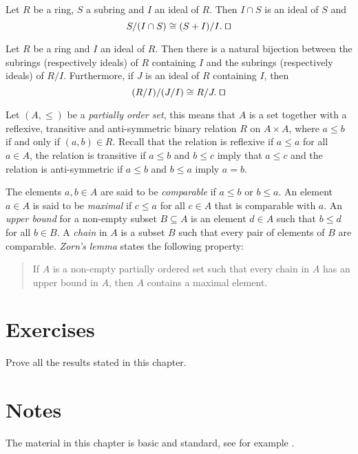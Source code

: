 \begin{theorem}
	Let $R$ be a ring,  $S$ a subring and $I$ an ideal of $R$. Then $I\cap S$ is an ideal of $S$ and
	$$S/(I\cap S)\cong (S+I)/I. \; \qed$$  
\end{theorem}

\begin{theorem} 
Let $R$ be a ring and $I$ an ideal of $R$. Then there is a natural bijection between the subrings (respectively ideals) of $R$ containing $I$ and the subrings (respectively ideals) of $R/I$. 
Furthermore, if $J$ is an ideal of $R$ containing $I$, then
\[
(R/I)/(J/I)\cong R/J.\; \qed
\]
\end{theorem}

Let $(A,\leq)$ be a {\em partially order set}, this means that $A$ is a set together with a 
reflexive, transitive and anti-symmetric binary relation
$R$ on $A\times A$, where $a\leq b$ if and only if $(a,b)\in R$. 
Recall that the relation is reflexive if $a\leq a$ for all $a\in A$, the relation is transitive if 
$a\leq b$ and $b\leq c$ imply that 
$a\leq c$ and the relation is anti-symmetric if $a\leq b$ and $b\leq a$ imply $a=b$.

The elements $a,b\in A$ are said to be {\em comparable} if $a\leq b$ or $b\leq
a$. An element $a\in A$ is said to be {\em maximal} if 
$c\leq a$ 
for all $c\in A$
that is comparable with $a$. 
An {\em upper bound} for a non-empty subset $B\subseteq A$ is an element $d\in
A$ such that $b\leq d$ for all $b\in B$. A {\em chain} in $A$ is a subset 
$B$ such that every pair of elements of $B$ are comparable. 
{\em Zorn's lemma} states the following property: 
\begin{quote}
	If $A$ is a non-empty partially ordered set such that every chain in 
	$A$ has an upper bound in $A$, then $A$ contains a maximal element. 
\end{quote}


\section{Exercises}

\begin{prob} 
    Prove all the results stated in this chapter.
\end{prob}

\section{Notes}

The material in this chapter is basic and standard, see for example \cite{Cohn}.
